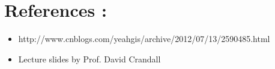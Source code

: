 \documentclass{article}
\begin{document}
			\section{References :}
			\begin{itemize}
				\item http://www.cnblogs.com/yeahgis/archive/2012/07/13/2590485.html 
				\item Lecture slides by Prof. David Crandall
			\end{itemize}
		
\end{document}
